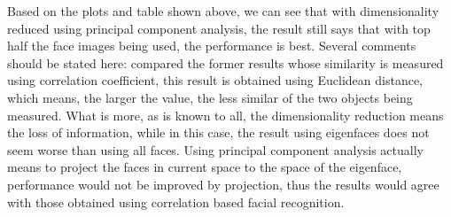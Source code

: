 \documentclass[a4paper]{article}
\begin{document}
\begin{spacing}{2.0}
	Based on the plots and table shown above, we can see that with dimensionality reduced using principal component analysis, the result still says that with top half the face images being used, the performance is best. Several comments should be stated here: compared the former results whose similarity is measured using correlation coefficient, this result is obtained using Euclidean distance, which means, the larger the value, the less similar of the two objects being measured. What is more, as is known to all, the dimensionality reduction means the loss of information, while in this case, the result using eigenfaces does not seem worse than using all faces. Using principal component analysis actually means to project the faces in current space to the space of the eigenface, performance would not be improved by projection, thus the results would agree with those obtained using correlation based facial recognition.

	
	
	
	
	

	
\end{spacing}
\end{document}
